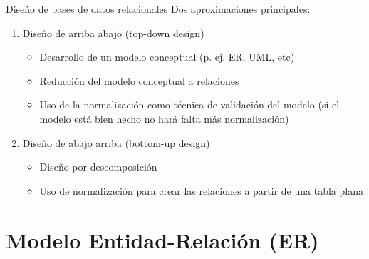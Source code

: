 \documentclass{classes/beamer_GeomaticaUA}
\begin{document}
\begin{frame}{Diseño de bases de datos relacionales}
Dos aproximaciones principales:
\begin{enumerate}
\item  Diseño de arriba abajo (top-down design)
\begin{itemize}
\item Desarrollo de un modelo conceptual (p. ej. ER, UML, etc)
\item Reducción del modelo conceptual a relaciones
\item Uso de la normalización como técnica de validación del modelo (si el modelo está bien hecho no hará falta más normalización)
\end{itemize}

\item Diseño de abajo arriba (bottom-up design)
\begin{itemize}
\item Diseño por descomposición
\item Uso de normalización para crear las relaciones a partir de una tabla plana
\end{itemize}
\end{enumerate}
\end{frame}

\section[Modelo ER]{Modelo Entidad-Relación (ER)}
\end{document}
